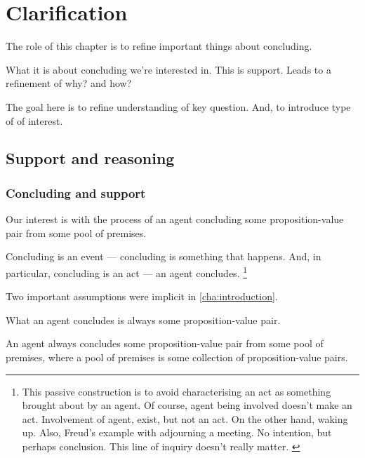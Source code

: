 \chapter{Clarification}
\label{cha:clarification}

\begin{note}
  The role of this chapter is to refine important things about concluding.

  What it is about concluding we're interested in.
  This is support.
  Leads to a refinement of why? and how?
\end{note}

\begin{note}
  The goal here is to refine understanding of key question.
  And, to introduce type of \scen{} of interest.
\end{note}

\section{Support and reasoning}
\label{sec:clarification:support-reasoning}

\subsection{Concluding and support}
\label{sec:clarification:support}

\begin{note}
  Our interest is with the process of an agent concluding some proposition-value pair from some pool of premises.

  Concluding is an event --- concluding is something that happens.
  And, in particular, concluding is an act --- an agent concludes.%
  \footnote{
    \color{red}
    This passive construction is to avoid characterising an act as something brought about by an agent.
    Of course, agent being involved doesn't make an act.
    Involvement of agent, exist, but not an act.
    On the other hand, waking up.
    {
      \color{red}
      Also, Freud's example with adjourning a meeting.
      No intention, but perhaps conclusion.
    }
    {
      \color{red} This line of inquiry doesn't really matter.
    }
  }

  Two important assumptions were implicit in \autoref{cha:introduction}.

  \begin{assumption}
    \label{assu:concluding:pvp}
    What an agent concludes is always some proposition-value pair.
  \end{assumption}

  \begin{assumption}
    \label{assu:concluding:pools}
    An agent always concludes some proposition-value pair from some pool of premises, where a pool of premises is some collection of proposition-value pairs.
  \end{assumption}
\end{note}

